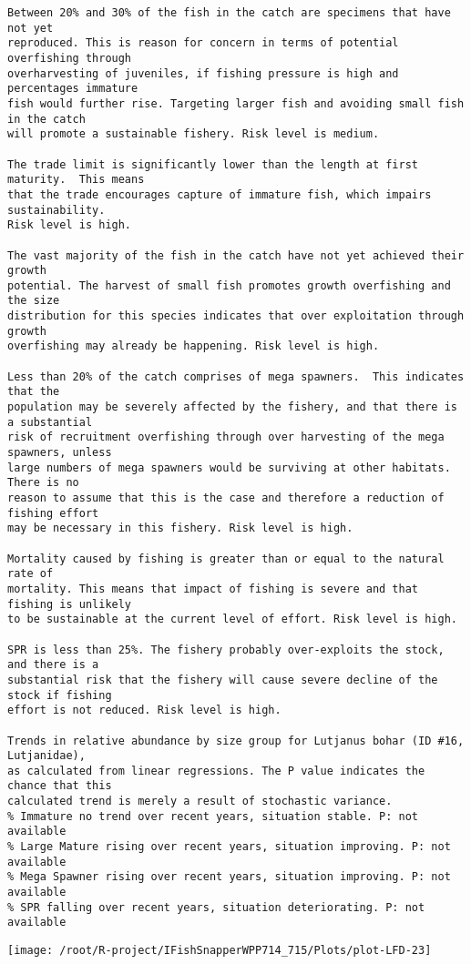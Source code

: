 \documentclass{report}\usepackage[]{graphicx}\usepackage[]{color}
\makeatletter
\def\maxwidth{ %
  \ifdim\Gin@nat@width>\linewidth
    \linewidth
  \else
    \Gin@nat@width
  \fi
}
\newenvironment{kframe}{%
 \def\at@end@of@kframe{}%
 \ifinner\ifhmode%
  \def\at@end@of@kframe{\end{minipage}}%
  \begin{minipage}{\columnwidth}%
 \fi\fi%
 \def\FrameCommand##1{\hskip\@totalleftmargin \hskip-\fboxsep
 \colorbox{shadecolor}{##1}\hskip-\fboxsep
     \hskip-\linewidth \hskip-\@totalleftmargin \hskip\columnwidth}%
 \MakeFramed {\advance\hsize-\width
   \@totalleftmargin\z@ \linewidth\hsize
   \@setminipage}}%
 {\par\unskip\endMakeFramed%
 \at@end@of@kframe}
\newenvironment{knitrout}{}{} %
\makeatother
\begin{document}
\begin{knitrout}
\begin{kframe}
\begin{verbatim}
Between 20% and 30% of the fish in the catch are specimens that have not yet
reproduced. This is reason for concern in terms of potential overfishing through
overharvesting of juveniles, if fishing pressure is high and percentages immature
fish would further rise. Targeting larger fish and avoiding small fish in the catch
will promote a sustainable fishery. Risk level is medium.

The trade limit is significantly lower than the length at first maturity.  This means
that the trade encourages capture of immature fish, which impairs sustainability.
Risk level is high.

The vast majority of the fish in the catch have not yet achieved their growth
potential. The harvest of small fish promotes growth overfishing and the size
distribution for this species indicates that over exploitation through growth
overfishing may already be happening. Risk level is high.

Less than 20% of the catch comprises of mega spawners.  This indicates that the
population may be severely affected by the fishery, and that there is a substantial
risk of recruitment overfishing through over harvesting of the mega spawners, unless
large numbers of mega spawners would be surviving at other habitats. There is no
reason to assume that this is the case and therefore a reduction of fishing effort
may be necessary in this fishery. Risk level is high.
 
Mortality caused by fishing is greater than or equal to the natural rate of
mortality. This means that impact of fishing is severe and that fishing is unlikely
to be sustainable at the current level of effort. Risk level is high.
 
SPR is less than 25%. The fishery probably over-exploits the stock, and there is a
substantial risk that the fishery will cause severe decline of the stock if fishing
effort is not reduced. Risk level is high.
 
Trends in relative abundance by size group for Lutjanus bohar (ID #16, Lutjanidae),
as calculated from linear regressions. The P value indicates the chance that this
calculated trend is merely a result of stochastic variance.
% Immature no trend over recent years, situation stable. P: not available
% Large Mature rising over recent years, situation improving. P: not available
% Mega Spawner rising over recent years, situation improving. P: not available
% SPR falling over recent years, situation deteriorating. P: not available
\end{verbatim}
\end{kframe}
\texttt{[image: /root/R-project/IFishSnapperWPP714\_715/Plots/plot-LFD-23]} 


\end{knitrout}
\end{document}
